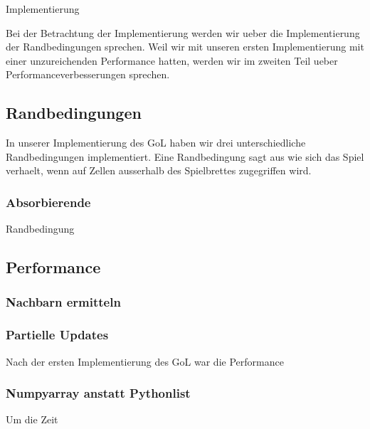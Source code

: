 \documentclass[runningheads]{llncs}
\begin{document}
\begin{section}{Implementierung}
    
    Bei der Betrachtung der Implementierung werden wir ueber die Implementierung der Randbedingungen sprechen.
    Weil wir mit unseren ersten Implementierung mit einer unzureichenden Performance hatten,
    werden wir im zweiten Teil ueber Performanceverbesserungen sprechen.
   
    

    \subsection{Randbedingungen}
        In unserer Implementierung des GoL haben wir drei unterschiedliche Randbedingungen implementiert.
        Eine Randbedingung sagt aus wie sich das Spiel verhaelt, wenn auf Zellen ausserhalb des Spielbrettes zugegriffen wird.
        
        \subsubsection{Absorbierende} Randbedingung

    \subsection{Performance}

    \subsubsection{Nachbarn ermitteln}

    \subsubsection{Partielle Updates}
        Nach der ersten Implementierung des GoL war die Performance 

    \subsubsection{Numpyarray anstatt Pythonlist}
        Um die Zeit 

    

\end{section}
\end{document}
